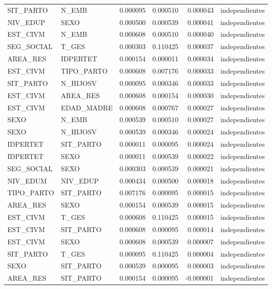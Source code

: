 \begin{tabular}{llrrrl}
SIT\_PARTO & N\_EMB & 0.000095 & 0.000510 & 0.000043 & independientes \\
NIV\_EDUP & SEXO & 0.000500 & 0.000539 & 0.000041 & independientes \\
EST\_CIVM & N\_EMB & 0.000608 & 0.000510 & 0.000040 & independientes \\
SEG\_SOCIAL & T\_GES & 0.000303 & 0.110425 & 0.000037 & independientes \\
AREA\_RES & IDPERTET & 0.000154 & 0.000011 & 0.000034 & independientes \\
EST\_CIVM & TIPO\_PARTO & 0.000608 & 0.007176 & 0.000033 & independientes \\
SIT\_PARTO & N\_HIJOSV & 0.000095 & 0.000346 & 0.000033 & independientes \\
EST\_CIVM & AREA\_RES & 0.000608 & 0.000154 & 0.000030 & independientes \\
EST\_CIVM & EDAD\_MADRE & 0.000608 & 0.000767 & 0.000027 & independientes \\
SEXO & N\_EMB & 0.000539 & 0.000510 & 0.000027 & independientes \\
SEXO & N\_HIJOSV & 0.000539 & 0.000346 & 0.000024 & independientes \\
IDPERTET & SIT\_PARTO & 0.000011 & 0.000095 & 0.000024 & independientes \\
IDPERTET & SEXO & 0.000011 & 0.000539 & 0.000022 & independientes \\
SEG\_SOCIAL & SEXO & 0.000303 & 0.000539 & 0.000021 & independientes \\
NIV\_EDUM & NIV\_EDUP & 0.000434 & 0.000500 & 0.000018 & independientes \\
TIPO\_PARTO & SIT\_PARTO & 0.007176 & 0.000095 & 0.000015 & independientes \\
AREA\_RES & SEXO & 0.000154 & 0.000539 & 0.000015 & independientes \\
EST\_CIVM & T\_GES & 0.000608 & 0.110425 & 0.000015 & independientes \\
EST\_CIVM & SIT\_PARTO & 0.000608 & 0.000095 & 0.000014 & independientes \\
EST\_CIVM & SEXO & 0.000608 & 0.000539 & 0.000007 & independientes \\
SIT\_PARTO & T\_GES & 0.000095 & 0.110425 & 0.000004 & independientes \\
SEXO & SIT\_PARTO & 0.000539 & 0.000095 & 0.000003 & independientes \\
AREA\_RES & SIT\_PARTO & 0.000154 & 0.000095 & -0.000001 & independientes \\

\end{tabular}
